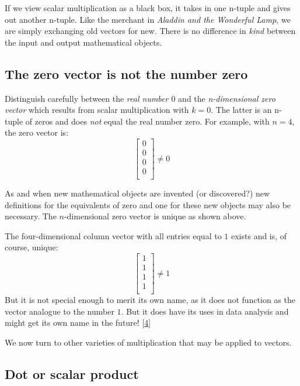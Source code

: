 \documentclass[
  a4paper,
]{article}
\begin{document}
If we view scalar multiplication as a black box, it takes in one n-tuple
and gives out another n-tuple. Like the merchant in \emph{Aladdin and
the Wonderful Lamp,} we are simply exchanging old vectors for new. There
is no difference in \emph{kind} between the input and output
mathematical objects.

\hypertarget{the-zero-vector-is-not-the-number-zero}{%
\subsection{The zero vector is not the number
zero}\label{the-zero-vector-is-not-the-number-zero}}

Distinguish carefully between the \emph{real number \(0\)} and the
\emph{n-dimensional zero vector} which results from scalar
multiplication with \(k = 0\). The latter is an n-tuple of zeros and
does \emph{not} equal the real number zero. For example, with \(n = 4\),
the zero vector is: \[
\begin{bmatrix}0\\0\\0\\0\\\end{bmatrix} \neq 0
\]

As and when new mathematical objects are invented (or discovered?) new
definitions for the equivalents of zero and one for these new objects
may also be necessary. The \(n\)-dimensional zero vector is unique as
shown above.

The four-dimensional column vector with all entries equal to \(1\)
exists and is, of course, unique: \[
\begin{bmatrix}1\\1\\1\\1\\\end{bmatrix} \ne 1
\] But it is not special enough to merit its own name, as it does not
function as the vector analogue to the number \(1\). But it does have
its uses in data analysis and might get its own name in the future!
{[}\protect\hyperlink{ref-honner2022}{4}{]}

We now turn to other varieties of multiplication that may be applied to
vectors.

\hypertarget{dot-or-scalar-product}{%
\subsection{Dot or scalar product}\label{dot-or-scalar-product}}
\end{document}

